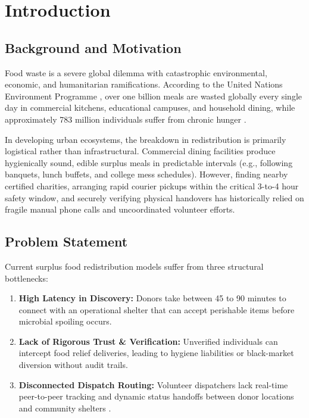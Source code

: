 \chapter{Introduction}
\label{ch:introduction}

\section{Background and Motivation}
Food waste is a severe global dilemma with catastrophic environmental, economic, and humanitarian ramifications. According to the United Nations Environment Programme \cite{unep2024foodwaste}, over one billion meals are wasted globally every single day in commercial kitchens, educational campuses, and household dining, while approximately 783 million individuals suffer from chronic hunger \cite{fao2023state}.

In developing urban ecosystems, the breakdown in redistribution is primarily logistical rather than infrastructural. Commercial dining facilities produce hygienically sound, edible surplus meals in predictable intervals (e.g., following banquets, lunch buffets, and college mess schedules). However, finding nearby certified charities, arranging rapid courier pickups within the critical 3-to-4 hour safety window, and securely verifying physical handovers has historically relied on fragile manual phone calls and uncoordinated volunteer efforts.

\section{Problem Statement}
Current surplus food redistribution models suffer from three structural bottlenecks:
\begin{enumerate}
    \item \textbf{High Latency in Discovery:} Donors take between 45 to 90 minutes to connect with an operational shelter that can accept perishable items before microbial spoiling occurs.
    \item \textbf{Lack of Rigorous Trust \& Verification:} Unverified individuals can intercept food relief deliveries, leading to hygiene liabilities or black-market diversion without audit trails.
    \item \textbf{Disconnected Dispatch Routing:} Volunteer dispatchers lack real-time peer-to-peer tracking and dynamic status handoffs between donor locations and community shelters \cite{patil2023realtime}.
\end{enumerate}

